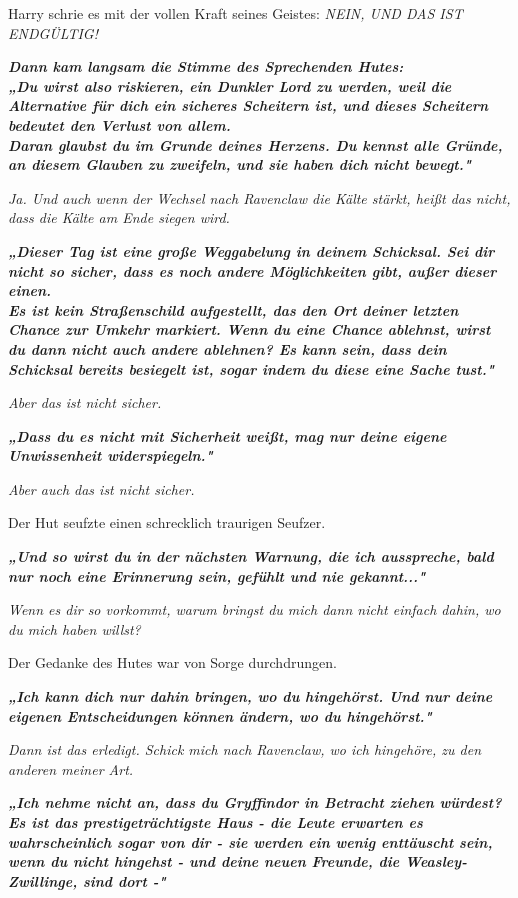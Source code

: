 {Harry schrie es mit der vollen Kraft seines Geistes: \emph{NEIN, UND DAS IST ENDGÜLTIG!}

\textbf{\emph{Dann kam langsam die Stimme des Sprechenden Hutes:\\ „Du wirst also riskieren, ein Dunkler Lord zu werden, weil die Alternative für dich ein sicheres Scheitern ist, und dieses Scheitern bedeutet den Verlust von allem.\\ Daran glaubst du im Grunde deines Herzens. Du kennst alle Gründe, an diesem Glauben zu zweifeln, und sie haben dich nicht bewegt."}}

\emph{Ja. Und auch wenn der Wechsel nach Ravenclaw die Kälte stärkt, heißt das nicht, dass die Kälte am Ende siegen wird.}

\textbf{\emph{„Dieser Tag ist eine große Weggabelung in deinem Schicksal. Sei dir nicht so sicher, dass es noch andere Möglichkeiten gibt, außer dieser einen.\\ Es ist kein Straßenschild aufgestellt, das den Ort deiner letzten Chance zur Umkehr markiert. Wenn du eine Chance ablehnst, wirst du dann nicht auch andere ablehnen? Es kann sein, dass dein Schicksal bereits besiegelt ist, sogar indem du diese eine Sache tust."}}

\emph{Aber das ist nicht sicher.}

\textbf{\emph{„Dass du es nicht mit Sicherheit weißt, mag nur deine eigene Unwissenheit widerspiegeln."}}

\emph{Aber auch das ist nicht sicher.}

Der Hut seufzte einen schrecklich traurigen Seufzer.

\textbf{\emph{„Und so wirst du in der nächsten Warnung, die ich ausspreche, bald nur noch eine Erinnerung sein, gefühlt und nie gekannt..."}}

\emph{Wenn es dir so vorkommt, warum bringst du mich dann nicht einfach dahin, wo du mich haben willst?}

Der Gedanke des Hutes war von Sorge durchdrungen.

\textbf{\emph{„Ich kann dich nur dahin bringen, wo du hingehörst. Und nur deine eigenen Entscheidungen können ändern, wo du hingehörst."}}

\emph{Dann ist das erledigt. Schick mich nach Ravenclaw, wo ich hingehöre, zu den anderen meiner Art.}

\textbf{\emph{„Ich nehme nicht an, dass du Gryffindor in Betracht ziehen würdest? Es ist das prestigeträchtigste Haus - die Leute erwarten es wahrscheinlich sogar von dir - sie werden ein wenig enttäuscht sein, wenn du nicht hingehst - und deine neuen Freunde, die Weasley-Zwillinge, sind dort -"}}

}
